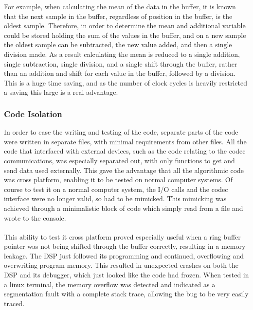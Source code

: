 For example, when calculating the mean of the data in the buffer, it is known that the next sample in the buffer, regardless of position in the buffer, is the oldest sample.
Therefore, in order to determine the mean and additional variable could be stored holding the sum of the values in the buffer, and on a new sample the oldest sample can be subtracted, the new value added, and then a single division made.
As a result calculating the mean is reduced to a single addition, single subtraction, single division, and a single shift through the buffer, rather than an addition and shift for each value in the buffer, followed by a division.
This is a huge time saving, and as the number of clock cycles is heavily restricted a saving this large is a real advantage.

\subsubsection{Code Isolation}
In order to ease the writing and testing of the code, separate parts of the code were written in separate files, with minimal requirements from other files.
All the code that interfaced with external devices, such as the code relating to the codec communications, was especially separated out, with only functions
to get and send data used externally.
This gave the advantage that all the algorithmic code was cross platform, enabling it to be tested on normal computer systems.
Of course to test it on a normal computer system, the I/O calls and the codec interface were no longer valid, so had to be mimicked.
This mimicking was achieved through a minimalistic block of code which simply read from a file and wrote to the console.
\\
\\
This ability to test it cross platform proved especially useful when a ring buffer pointer was not being shifted through the buffer correctly, resulting in a memory leakage.
The DSP just followed its programming and continued, overflowing and overwriting program memory.
This resulted in unexpected crashes on both the DSP and its debugger, which just looked like the code had frozen.
When tested in a linux terminal, the memory overflow was detected and indicated as a segmentation fault with a complete stack trace, allowing the bug to be very easily traced.

